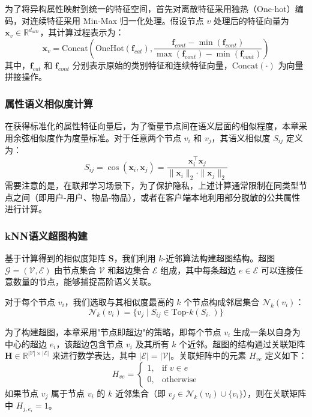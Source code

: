 为了将异构属性映射到统一的特征空间，首先对离散特征采用独热（One-hot）编码，对连续特征采用 Min-Max 归一化处理。假设节点 $v$ 处理后的特征向量为 $\mathbf{x}_v \in \mathbb{R}^{d_{attr}}$，其计算过程表示为：
\begin{equation}
    \mathbf{x}_v = \text{Concat}\left( \text{OneHot}(\mathbf{f}_{cat}), \frac{\mathbf{f}_{cont} - \min(\mathbf{f}_{cont})}{\max(\mathbf{f}_{cont}) - \min(\mathbf{f}_{cont})} \right)
\end{equation}
其中，$\mathbf{f}_{cat}$ 和 $\mathbf{f}_{cont}$ 分别表示原始的类别特征和连续特征向量，$\text{Concat}(\cdot)$ 为向量拼接操作。

\subsubsection{属性语义相似度计算}
在获得标准化的属性特征向量后，为了衡量节点间在语义层面的相似程度，本章采用余弦相似度作为度量标准。对于任意两个节点 $v_i$ 和 $v_j$，其语义相似度 $S_{ij}$ 定义为：
\begin{equation}
    S_{ij} = \cos(\mathbf{x}_i, \mathbf{x}_j) = \frac{\mathbf{x}_i^\top \mathbf{x}_j}{\|\mathbf{x}_i\|_2 \cdot \|\mathbf{x}_j\|_2}
\end{equation}
需要注意的是，在联邦学习场景下，为了保护隐私，上述计算通常限制在同类型节点之间（即用户-用户、物品-物品），或者在客户端本地利用部分脱敏的公共属性进行计算。

\subsubsection{kNN语义超图构建}
基于计算得到的相似度矩阵 $\mathbf{S}$，我们利用 $k$-近邻算法构建超图结构。超图 $\mathcal{G} = (\mathcal{V}, \mathcal{E})$ 由节点集合 $\mathcal{V}$ 和超边集合 $\mathcal{E}$ 组成，其中每条超边 $e \in \mathcal{E}$ 可以连接任意数量的节点，能够捕捉高阶语义关联。

对于每个节点 $v_i$，我们选取与其相似度最高的 $k$ 个节点构成邻居集合 $\mathcal{N}_k(v_i)$：
\begin{equation}
    \mathcal{N}_k(v_i) = \{ v_j \mid S_{ij} \in \text{Top-}k(S_{i \cdot}) \}
\end{equation}

为了构建超图，本章采用"节点即超边"的策略，即每个节点 $v_i$ 生成一条以自身为中心的超边 $e_i$，该超边包含节点 $v_i$ 及其所有 $k$ 个近邻。超图的结构通过关联矩阵 $\mathbf{H} \in \mathbb{R}^{|\mathcal{V}| \times |\mathcal{E}|}$ 来进行数学表达，其中 $|\mathcal{E}| = |\mathcal{V}|$。关联矩阵中的元素 $H_{ve}$ 定义如下：
\begin{equation}
    H_{ve} = \begin{cases} 
    1, & \text{if } v \in e \\
    0, & \text{otherwise}
    \end{cases}
\end{equation}
如果节点 $v_j$ 属于节点 $v_i$ 的 $k$ 近邻集合（即 $v_j \in \mathcal{N}_k(v_i) \cup \{v_i\}$），则在关联矩阵中 $H_{j, e_i} = 1$。

